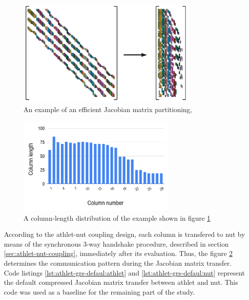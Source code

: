 \figpointer{\ref{fig:matrix-partitioning-example}}
\begin{figure}[htpb]
  \centering
  \includegraphics[width=0.8\textwidth]{figures/matrix-compression.png}
  \caption{An example of an efficient Jacobian matrix partitioning, \cite{gebremedhin2005color}} \label{fig:matrix-partitioning-example}
\end{figure}


\begin{figure}[htpb]
  \centering
  \includegraphics[width=0.7\textwidth]{figures/matrix-compression-2.png}
  \caption{A column-length distribution of the example shown in figure \ref{fig:matrix-partitioning-example}} \label{fig:matrix-column-distribution}
\end{figure}


According to the \acrshort{athlet}-\acrshort{nut} coupling design, each column is transfered to \acrshort{nut} by means of the synchronous 3-way handshake procedure, described in section \ref{sec:athlet-nut-coupling}, immediately after its evaluation. Thus, the figure \ref{fig:matrix-column-distribution} determines the communication pattern during the Jacobian matrix transfer.\\


Code listings \ref{lst:athlet-grs-defaul:athlet} and \ref{lst:athlet-grs-defaul:nut} represent the default compressed Jacobian matrix transfer between \acrshort{athlet} and \acrshort{nut}. This code was used as a baseline for the remaining part of the study.\\


